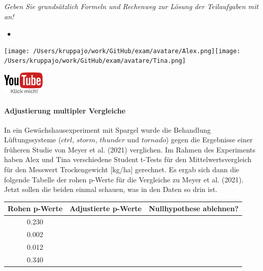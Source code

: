 \documentclass[a4paper, 9pt]{scrartcl}\usepackage[]{graphicx}\usepackage[]{xcolor}
\newenvironment{knitrout}{}{} %
\begin{document}
\textit{Geben Sie grundsätzlich Formeln und Rechenweg zur Lösung der Teilaufgaben mit an!} \\[1Ex]
 

 
\ifcollection
\begin{flushright}
\tiny\vspace{-3Ex}
\textbf{\examinhaltstart}
\exammodulestatversuch $\;\bullet$
\exammodulebiostat
\vspace{-4Ex}
\end{flushright}
\begin{minipage}[t]{0.5\textwidth}
\texttt{[image: /Users/kruppajo/work/GitHub/exam/avatare/Alex.png]}\hspace{-4mm}\texttt{[image: /Users/kruppajo/work/GitHub/exam/avatare/Tina.png]}
\end{minipage}
\begin{minipage}[t]{0.5\textwidth}
\hfill
\href{https://youtu.be/kHmfEmU6lrk}{\includegraphics[width = 2cm]{img/youtube}}
\end{minipage}
\fi



\ifcollection
\paragraph{Adjustierung multipler Vergleiche}
\fi

In ein Gewächshausexperiment mit Spargel wurde die Behandlung Lüftungssysteme ($ctrl$, $storm$, $thunder$ und $tornado$) gegen die Ergebnisse einer früheren Studie von Meyer et al. (2021) verglichen. Im Rahmen des Experiments haben Alex und Tina verschiedene Student t-Tests für den Mittelwertsvergleich für den Messwert Trockengewicht [kg/ha] gerechnet. Es ergab sich dann die folgende Tabelle der rohen p-Werte für die Vergleiche zu Meyer et al. (2021). Jetzt sollen die beiden einmal schauen, was in den Daten so drin ist.

\begin{knitrout}
\color{fgcolor}\begin{table}[!h]
\centering\begingroup\fontsize{10}{12}\selectfont

\begin{tabular}{ccc}
\toprule
\textbf{Rohen p-Werte} & \textbf{Adjustierte p-Werte} & \textbf{Nullhypothese ablehnen?}\\
\midrule
0.230 &  & \\
0.002 &  & \\
0.012 &  & \\
0.340 &  & \\
\bottomrule
\end{tabular}
\endgroup{}
\end{table}

\end{knitrout}
\end{document}
